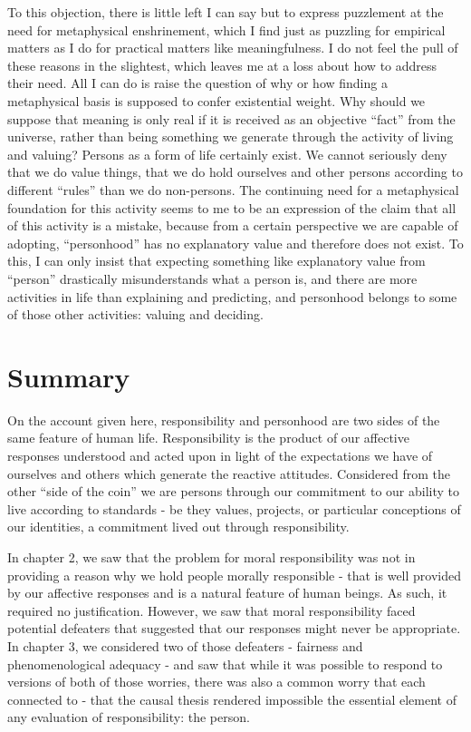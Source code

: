 \documentclass[phd,12pt,oneside,paper=letterpaper]{ubcthesis}
\begin{document}
To this objection, there is little left I can say but to express puzzlement at the need for metaphysical enshrinement, which I find just as puzzling for empirical matters as I do for practical matters like meaningfulness. I do not feel the pull of these reasons in the slightest, which leaves me at a loss about how to address their need. All I can do is raise the question of why or how finding a metaphysical basis is supposed to confer existential weight. Why should we suppose that meaning is only real if it is received as an objective ``fact'' from the universe, rather than being something we generate through the activity of living and valuing? Persons as a form of life certainly exist. We cannot seriously deny that we do value things, that we do hold ourselves and other persons according to different ``rules'' than we do non-persons. The continuing need for a metaphysical foundation for this activity seems to me to be an expression of the claim that all of this activity is a mistake, because from a certain perspective we are capable of adopting, ``personhood'' has no explanatory value and therefore does not exist. To this, I can only insist that expecting something like explanatory value from ``person'' drastically misunderstands what a person is, and there are more activities in life than explaining and predicting, and personhood belongs to some of those other activities: valuing and deciding.

\section{Summary}
On the account given here, responsibility and personhood are two sides of the same feature of human life. Responsibility is the product of our affective responses understood and acted upon in light of the expectations we have of ourselves and others which generate the reactive attitudes. Considered from the other ``side of the coin'' we are persons through our commitment to our ability to live according to standards - be they values, projects, or particular conceptions of our identities, a commitment lived out through responsibility.

In chapter 2, we saw that the problem for moral responsibility was not in providing a reason why we hold people morally responsible - that is well provided by our affective responses and is a natural feature of human beings. As such, it required no justification. However, we saw that moral responsibility faced potential defeaters that suggested that our responses might never be appropriate.  In chapter 3, we considered two of those defeaters - fairness and phenomenological adequacy - and saw that while it was possible to respond to versions of both of those worries, there was also a common worry that each connected to - that the causal thesis rendered impossible the essential element of any evaluation of responsibility: the person. 
\end{document}
